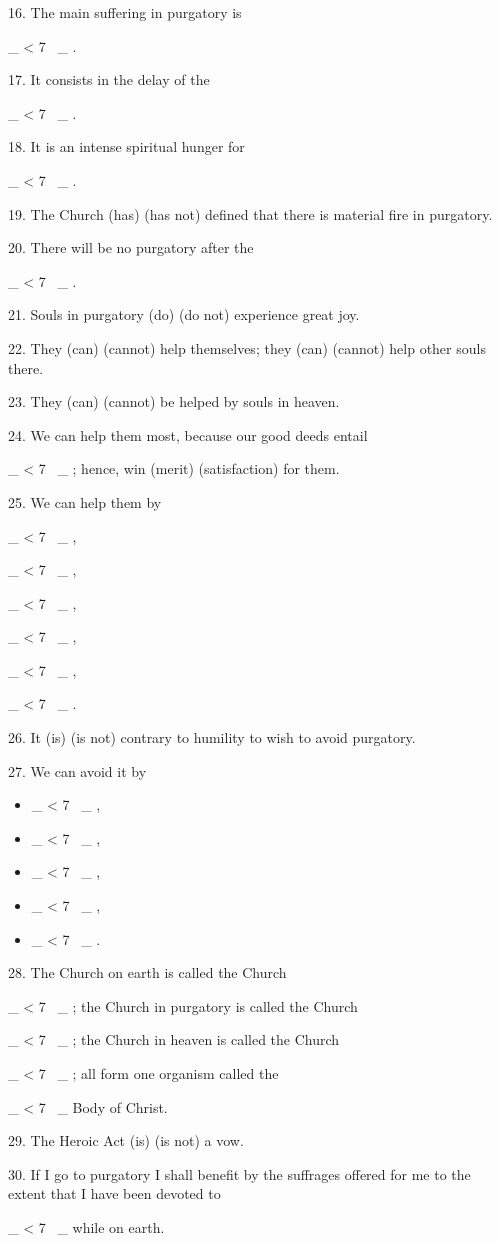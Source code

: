\documentclass[a4paper,14pt]{memoir}
\newcommand\textjarman[1]{{\jarman #1}}
\newcounter{z}
\newcommand\spaces[1]{\rule{0pt}{18pt} \_\loop \ifnum\value{z} < #1
~\_%
\stepcounter{z}%
\repeat%
\setcounter{z}{0}}
\begin{document}
16. The main suffering in purgatory is \spaces{7}. 

17. It consists in the  delay
of the \spaces{7}. 

18. It is an intense spiritual hunger  for  \spaces{7}.  

19.  The
Church (\textjarman{has}) (\textjarman{has not}) defined that there is  material  fire  in  purgatory.


20. There will be no purgatory after the  \spaces{7}.  

21.  Souls  in  purgatory
(\textjarman{do})  (\textjarman{do  not})  experience  great  joy.  

22.  They  (\textjarman{can})   (\textjarman{cannot})   help
themselves; they (\textjarman{can}) (\textjarman{cannot}) help  other  souls  there.  

23.  They  (\textjarman{can})
(\textjarman{cannot}) be helped by souls in heaven. 

24. We can help  them  most,  because
our good deeds entail \spaces{7}; hence, win (\textjarman{merit})  (\textjarman{satisfaction})  for  them.


25. We can help them by \spaces{7}, \spaces{7}, \spaces{7}, \spaces{7}, \spaces{7}, \spaces{7}. 

26. 
It (\textjarman{is}) (\textjarman{is not}) contrary to humility to wish to  avoid  purgatory.  

27.  We
can avoid it by 
\begin{itemize}
\item \spaces{7},
\item  \spaces{7},  
\item \spaces{7}, 
\item \spaces{7}, 
\item \spaces{7}.
\end{itemize} 

28. 
The Church on earth is called the Church \spaces{7}; the Church in purgatory  is
called the Church \spaces{7}; the Church in heaven is called the Church  \spaces{7};
 all form one organism called the \spaces{7} Body of Christ. 

29. The Heroic  Act
(\textjarman{is}) (\textjarman{is not}) a vow. 

30. If I  go  to  purgatory  I  shall  benefit  by  the
suffrages offered for me to the extent that I have been  devoted  to  \spaces{7}
while on earth.

\newpage
\end{document}
